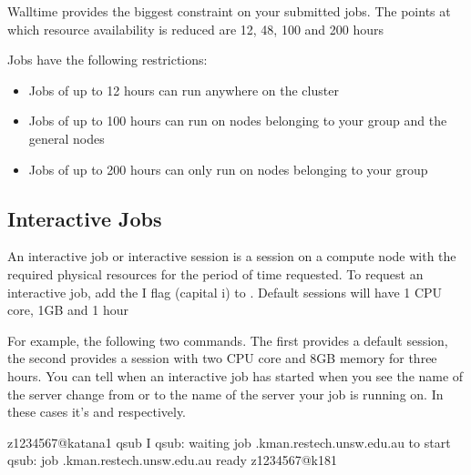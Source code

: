 \documentclass[letterpaper,10pt,english]{sphinxmanual}
\begin{document}
Walltime provides the biggest constraint on your submitted jobs. The points at which resource availability is reduced are 12, 48, 100 and 200 hours

Jobs have the following restrictions:
\begin{itemize}
\item {} 
Jobs of up to 12 hours can run anywhere on the cluster

\item {} 
Jobs of up to 100 hours can run on nodes belonging to your group and the general nodes

\item {} 
Jobs of up to 200 hours can only run on nodes belonging to your group

\end{itemize}


\subsection{Interactive Jobs}
\label{\detokenize{using_katana/running_jobs:interactive-jobs}}\label{\detokenize{using_katana/running_jobs:interactive-session}}\label{\detokenize{using_katana/running_jobs:interactive-job}}
An interactive job or interactive session is a session on a compute node with the required physical resources for the period of time requested. To request an interactive job, add the \sphinxhyphen{}I flag (capital i) to . Default sessions will have 1 CPU core, 1GB and 1 hour

For example, the following two commands. The first provides a default session, the second provides a session with two CPU core and 8GB memory for three hours. You can tell when an interactive job has started when you see the name of the server change from  or  to the name of the server your job is running on. In these cases it’s  and  respectively.

\begin{sphinxVerbatim}[commandchars=\\\{\}]
\PYG{o}{[}z1234567@katana1 \PYGZti{}\PYG{o}{]}\PYGZdl{} qsub \PYGZhy{}I
qsub: waiting  job .kman.restech.unsw.edu.au to start
qsub: job .kman.restech.unsw.edu.au ready
\PYG{o}{[}z1234567@k181 \PYGZti{}\PYG{o}{]}\PYGZdl{}
\end{sphinxVerbatim}
\end{document}
